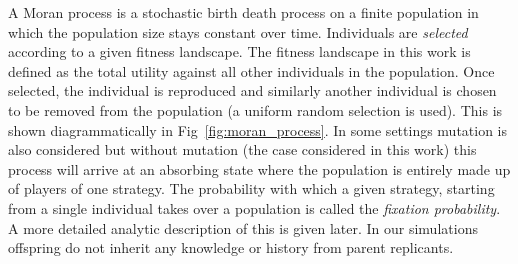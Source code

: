 \documentclass[10pt,letterpaper]{article}
\begin{document}
A Moran process is a stochastic birth death process on a finite population in which the
population size stays constant over time. Individuals are \textit{selected}
according to a given fitness landscape. The fitness landscape in this work is
defined as the total utility against all other individuals in the population.
Once selected, the individual
is reproduced and similarly another individual is chosen to be removed from the
population (a uniform random selection is used). This is shown diagrammatically
in Fig~\ref{fig:moran_process}. In some settings mutation is
also considered but without mutation (the case considered in this work) this
process will arrive at an absorbing state where the population is entirely made
up of players of one strategy. The probability with which a given strategy,
starting from a single individual takes
over a population is called the \textit{fixation probability}. A more detailed
analytic description of this is given later. In our
simulations offspring do not inherit any knowledge or history from parent
replicants.
\end{document}
